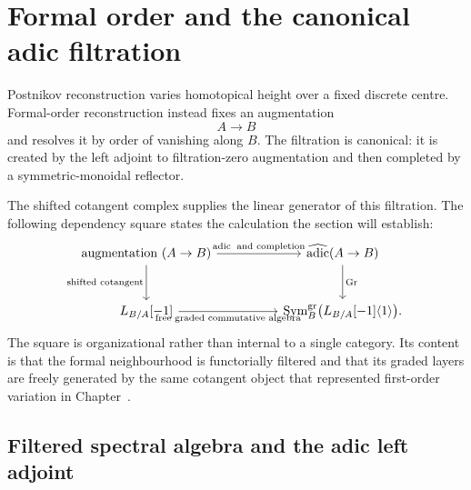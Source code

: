 \section{Formal order and the canonical adic filtration}
\label{sec:canonical-adic-filtration}


Postnikov reconstruction varies homotopical height over a fixed discrete centre.
Formal-order reconstruction instead fixes an augmentation
\[
    A\longrightarrow B
\]
and resolves it by order of vanishing along \(B\). The filtration is canonical: it is
created by the left adjoint to filtration-zero augmentation and then completed by a
symmetric-monoidal reflector.

The shifted cotangent complex supplies the linear generator of this filtration. The
following dependency square states the calculation the section will establish:
\[
\begin{tikzcd}[column sep=huge,row sep=large]
    \text{augmentation }(A\to B)
        \arrow[r,"\operatorname{adic}\ \text{and completion}"]
        \arrow[d,"\text{shifted cotangent}"']
    &
    \widehat{\operatorname{adic}}(A\to B)
        \arrow[d,"\operatorname{Gr}"]
    \\
    L_{B/A}[-1]
        \arrow[r,"\text{free graded commutative algebra}"']
    &
    \operatorname{Sym}^{\mathrm{gr}}_B
        \bigl(L_{B/A}[-1]\langle1\rangle\bigr).
\end{tikzcd}
\]
The square is organizational rather than internal to a single category. Its content is
that the formal neighbourhood is functorially filtered and that its graded layers are
freely generated by the same cotangent object that represented first-order variation in
Chapter~.

\subsection{Filtered spectral algebra and the adic left adjoint}

